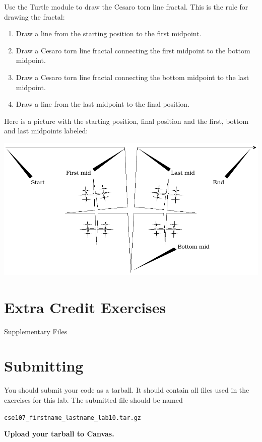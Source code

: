 \documentclass[11pt]{cselabheader}
\begin{document}
\begin{ex}[cesaro.py]
Use the Turtle module to draw the Cesaro torn line fractal.
This is the rule for drawing the fractal:
\begin{enumerate}
\item Draw a line from the starting position to the first midpoint.
\item Draw a Cesaro torn line fractal connecting the first midpoint to
the bottom midpoint.
\item Draw a Cesaro torn line fractal connecting the bottom midpoint
to the last midpoint.
\item Draw a line from the last midpoint to the final position.
\end{enumerate}

Here is a picture with the starting position, final position and the first,
bottom and last midpoints labeled:

\begin{center}
\includegraphics[width=\textwidth]{img/labeledcesaro.png}
\end{center}
\end{ex}

\section{Extra Credit Exercises}

\begin{extraex}[lsystem.py]
\end{extraex}

\begin{infobox}{Supplementary Files}
\end{infobox}

\newpage
\section{Submitting}

You should submit your code as a tarball. It should contain all files
used in the exercises for this lab. The submitted file should be named
\begin{center}
  \texttt{cse107\_firstname\_lastname\_lab10.tar.gz}
\end{center}

\begin{center}
  \textbf{Upload your tarball to Canvas.}
\end{center}

\listofexercises
\listofextraexercises
\end{document}

